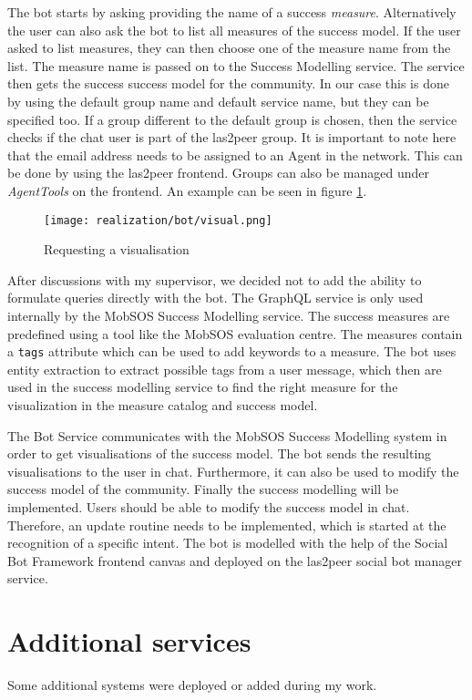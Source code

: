 The bot starts by asking providing the name of a success \emph{measure}. Alternatively the user can also ask the bot to list all measures of the success model.
If the user asked to list measures, they can then choose one of the measure name from the list. 
The measure name is passed on to the Success Modelling service. The service then gets the success success model for the community. In our case this is done by using the default group name and default service name, but they can be specified too.
If a group different to the default group is chosen, then the service checks if the chat user is part of the las2peer group. It is important to note here that the email address needs to be assigned to an Agent in the network. This can be done by using the las2peer frontend. Groups can also be managed under \emph{AgentTools} on the frontend.   
 An example can be seen in figure \ref{fig:visualReq}.
\begin{figure}[h]
    \centering
    \texttt{[image: realization/bot/visual.png]}
    \caption{Requesting a visualisation}
    \label{fig:visualReq}
\end{figure}

After discussions with my supervisor, we decided not to add the ability to formulate queries directly with the bot. The GraphQL service is only used internally by the MobSOS Success Modelling service. The success measures are predefined using a tool like the MobSOS evaluation centre. The measures contain a \texttt{tags} attribute which can be used to add keywords to a measure. The bot uses entity extraction to extract possible tags from a user message, which then are used in the success modelling service to find the right measure for the visualization in the measure catalog and success model.

The Bot Service communicates with the MobSOS Success Modelling system in order to get visualisations of the success model. The bot sends the resulting visualisations to the user in chat.
Furthermore, it can also be used to modify the success model of the community. 
Finally the success modelling will be implemented. Users should be able
to modify the success model in chat. Therefore, an update routine needs to be implemented, which is started at the recognition of a specific intent.
The bot is modelled with the help of the Social Bot Framework frontend canvas and deployed on the las2peer social bot manager service.


\section{Additional services}\label{sec:additional}
Some additional systems were deployed or added during my work.

